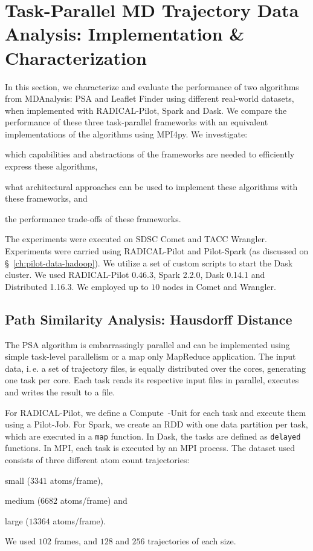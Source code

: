 \section{Task-Parallel MD Trajectory Data Analysis: Implementation \& Characterization}
\label{sec:impl_exp}
In this section, we characterize and evaluate the performance of two algorithms from MDAnalysis: PSA and Leaflet Finder using different real-world datasets, when implemented with RADICAL-Pilot, Spark and Dask.
We compare the performance of these three task-parallel frameworks with an equivalent implementations of the algorithms using MPI4py.
We investigate: 
\begin{inparaenum}[1)]
    \item which capabilities and abstractions of the frameworks are needed to efficiently express these algorithms,
    \item what architectural approaches can be used to implement these algorithms with these frameworks, and
    \item the performance trade-offs of these frameworks.
\end{inparaenum}

The experiments were executed on SDSC Comet and TACC Wrangler.
Experiments were carried using RADICAL-Pilot and Pilot-Spark (as discussed on \S~\ref{ch:pilot-data-hadoop}).
We utilize a set of custom scripts to start the Dask cluster.
We used RADICAL-Pilot 0.46.3, Spark 2.2.0, Dask 0.14.1 and Distributed 1.16.3.
We employed up to $10$ nodes in Comet and Wrangler. 

\subsection{Path Similarity Analysis: Hausdorff Distance}
\label{sec:psa}
The PSA algorithm is embarrassingly parallel and can be implemented using simple task-level parallelism or a map only MapReduce application.
The input data, i.\,e. a set of trajectory files, is equally distributed over the cores, generating one task per core.
Each task reads its respective input files in parallel, executes and writes the result to a file.

For RADICAL-Pilot, we define a Compute~-Unit for each task and execute them using a Pilot-Job. 
For Spark, we create an RDD with one data partition per task, which are executed in a \texttt{map} function.
In Dask, the tasks are defined as \texttt{delayed} functions.
In MPI, each task is executed by an MPI process.
The dataset used consists of three different atom count trajectories: 
\begin{inparaenum}[1)]
    \item small ($3341$ atoms/frame), 
    \item medium ($6682$ atoms/frame) and 
    \item large ($13364$ atoms/frame).
\end{inparaenum}
We used $102$ frames, and $128$ and $256$ trajectories of each size.

